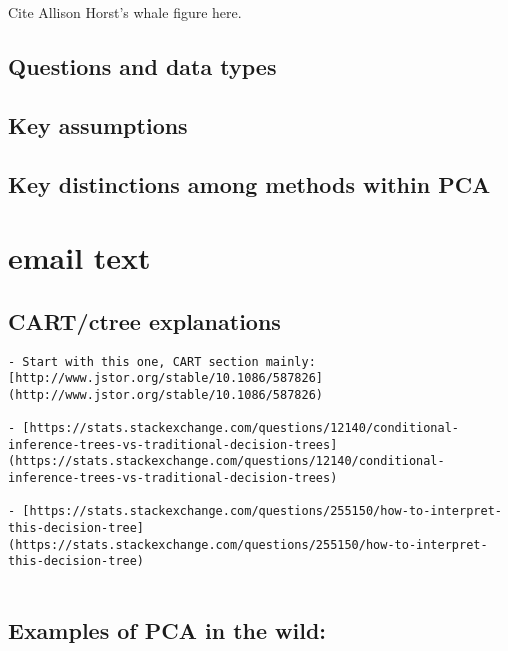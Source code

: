 \documentclass[
]{book}
\begin{document}
Cite Allison Horst's whale figure here.

\hypertarget{questions-and-data-types}{%
\subsection{Questions and data types}\label{questions-and-data-types}}

\hypertarget{key-assumptions}{%
\subsection{Key assumptions}\label{key-assumptions}}

\hypertarget{key-distinctions-among-methods-within-pca}{%
\subsection{Key distinctions among methods within PCA}\label{key-distinctions-among-methods-within-pca}}

\hypertarget{email-text}{%
\section{email text}\label{email-text}}

\hypertarget{cartctree-explanations}{%
\subsection{CART/ctree explanations}\label{cartctree-explanations}}

\begin{verbatim}
- Start with this one, CART section mainly: [http://www.jstor.org/stable/10.1086/587826](http://www.jstor.org/stable/10.1086/587826)
    
- [https://stats.stackexchange.com/questions/12140/conditional-inference-trees-vs-traditional-decision-trees](https://stats.stackexchange.com/questions/12140/conditional-inference-trees-vs-traditional-decision-trees)
    
- [https://stats.stackexchange.com/questions/255150/how-to-interpret-this-decision-tree](https://stats.stackexchange.com/questions/255150/how-to-interpret-this-decision-tree)
    
\end{verbatim}

\hypertarget{examples-of-pca-in-the-wild}{%
\subsection{Examples of PCA in the wild:}\label{examples-of-pca-in-the-wild}}
\end{document}
